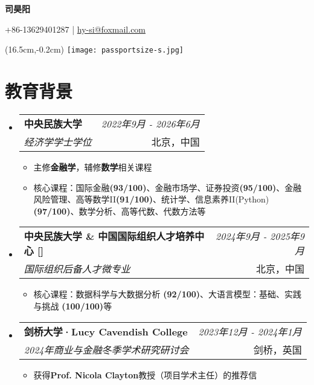 \documentclass[a4paper,11pt]{article}
\makeatletter
\newcommand{\resumeSubheading}[4]{
\vspace{0.5mm}\item
    \begin{tabular*}{0.98\textwidth}[t]{l@{\extracolsep{\fill}}r}
        \textbf{#1} & \textit{\footnotesize{#4}} \\
        \textit{\footnotesize{#3}} &  \footnotesize{#2}\\
    \end{tabular*}
    \vspace{-2.4mm}
}
\newcommand{\resumeSubHeadingListStart}{\begin{itemize}[leftmargin=*,labelsep=1mm]}
\newcommand{\resumeItemListStart}{\begin{itemize}[leftmargin=*,labelsep=1mm,itemsep=0.5mm]}
\newcommand{\resumeSubHeadingListEnd}{\end{itemize}\vspace{2mm}}
\newcommand{\resumeItemListEnd}{\end{itemize}\vspace{-2mm}}
\newcommand{\headerfontiii}{\fontfamily{ppl}\selectfont} %
\makeatother
\begin{document}
\begin{CJK*}{UTF8}{gbsn}
\headerfontiii

\begin{center}
    {\Huge\textbf{司昊阳}}
\end{center}
\vspace{-6mm}

\begin{center}
    \small{
    +86-13629401287 | \href{mailto:youremail@example.com}{hy-si@foxmail.com}
    }
\end{center}

\begin{textblock*}{2.5cm}(16.5cm,-0.2cm)
    \texttt{[image: passportsize-s.jpg]}
\end{textblock*}

\vspace{1mm}

\section{\textbf{教育背景}}
\vspace{-0.4mm}
\resumeSubHeadingListStart

\resumeSubheading
{中央民族大学}{北京，中国}
{经济学学士学位}{2022年9月 - 2026年6月}
\resumeItemListStart
\item 主修\textbf{金融学}，辅修\textbf{数学}相关课程
\item 核心课程：国际金融\textbf{(93/100)}、金融市场学、证券投资\textbf{(95/100)}、金融风险管理、高等数学II\textbf{(91/100)}、统计学、信息素养II(Python)\textbf{(97/100)}、数学分析、高等代数、代数方法等
\resumeItemListEnd

\resumeSubheading
{中央民族大学 \& 中国国际组织人才培养中心 [\href{https://ppe.ccipe.edu.cn/}{\faIcon{globe}}]}{北京，中国}
{国际组织后备人才微专业}{2024年9月 - 2025年9月}
\resumeItemListStart
\item 核心课程：数据科学与大数据分析 \textbf{(92/100)}、大语言模型：基础、实践与挑战 \textbf{(100/100)}等
\resumeItemListEnd

\resumeSubheading
{剑桥大学·Lucy Cavendish College}{剑桥，英国}
{2024年商业与金融冬季学术研究研讨会}{2023年12月 - 2024年1月}

\resumeItemListStart
\item 获得\textbf{Prof. Nicola Clayton}教授（项目学术主任）的推荐信
\resumeItemListEnd

\resumeSubHeadingListEnd
\vspace{-6mm}



\end{CJK*}
\end{document}
